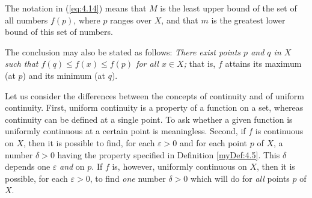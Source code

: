 The notation in (\ref{eq:4.14}) means that 
$M$ is the least upper bound of the set of all numbers $f(p)$, 
where $p$ ranges over $X$, 
and that $m$ is the greatest lower bound of this set of numbers.

The conclusion may also be stated as follows: 
\emph{There exist points $p$ and $q$
in $X$ such that $f(q) \leq f(x) \leq f(p)$ for all $x \in X$;} 
that is, $f$ attains its maximum (at $p$) and its minimum (at $q$).



Let us consider the differences between the concepts of continuity and of
uniform continuity. 
First, uniform continuity is a property of a function on a set, 
whereas continuity can be defined at a single point. 
To ask whether a given function is uniformly continuous at a certain point is meaningless. 
Second, if $f$ is continuous on $X$, 
then it is possible to find, 
for each $\varepsilon > 0$ and for each point $p$ of $X$, 
a number $\delta > 0$ having the property specified in Definition \ref{myDef:4.5}. 
This $\delta$ depends one $\varepsilon$ \emph{and} on $p$. 
If $f$ is, however, uniformly continuous on $X$, 
then it is possible, for each $\varepsilon > 0$, 
to find \emph{one} number $\delta > 0$ which will do for \emph{all} points $p$ of $X$.

